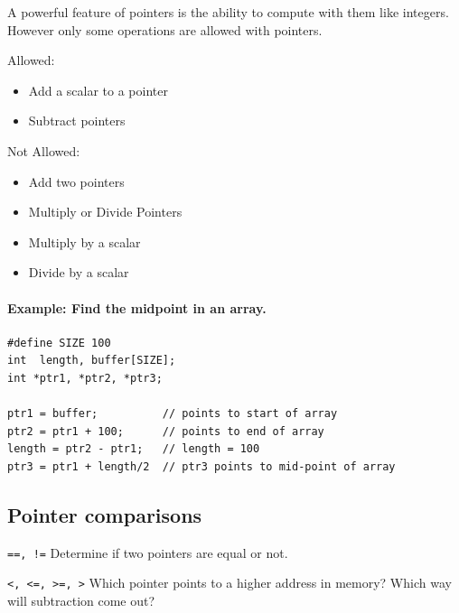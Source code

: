 A powerful feature of pointers is the ability to compute with them like
integers.  However only some operations are allowed with pointers.

Allowed:
\begin{itemize}
  \item Add a scalar to a pointer
  \item Subtract pointers
\end{itemize}

Not Allowed:
\begin{itemize}
  \item Add two pointers
  \item Multiply or Divide Pointers
  \item Multiply by a scalar
  \item Divide by a scalar
\end{itemize}

\paragraph{Example: Find the midpoint in an array.}

\begin{verbatim}
#define SIZE 100
int  length, buffer[SIZE];
int *ptr1, *ptr2, *ptr3;

ptr1 = buffer;          // points to start of array
ptr2 = ptr1 + 100;      // points to end of array
length = ptr2 - ptr1;   // length = 100
ptr3 = ptr1 + length/2  // ptr3 points to mid-point of array

\end{verbatim}

\subsection{Pointer comparisons}

{\tt ==, !=} \hspace{0.5in} Determine if two pointers are equal or not.

{\tt <, <=, >=, >} \hspace{0.5in} Which pointer points to a higher
address in memory?  Which way will subtraction come out?





%

